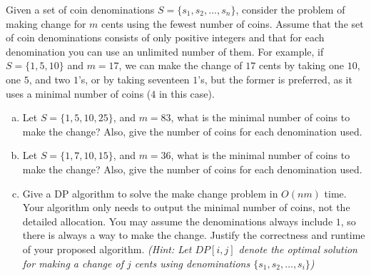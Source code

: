 \documentclass[11pt]{article}
\begin{document}
    \begin{tcolorbox}[title={Problem 2 (Make Change, 50 points)}] \setlength\parindent{1em}
        
     Given a set of coin denominations $S=\{s_1, s_2,\dots, s_n\}$, consider the problem of making change for $m$ cents using the fewest
        number of coins. Assume that the set of coin denominations consists of only positive integers and that for each denomination you can use an unlimited number of them. For example, if $S=\{1, 5, 10\}$ and $m=17$, we can make the change of $17$ cents by taking one $10$, one $5$, and two $1$'s, or by taking seventeen $1$'s, but the former is preferred, as it uses a minimal number of coins ($4$ in this case).

    \begin{enumerate}[(a)]
    \item Let $S=\{1, 5, 10, 25\}$, and $m=83$, what is the minimal number of coins to make the change? Also, give the number of coins for each denomination used.
    \item Let $S=\{1, 7, 10, 15\}$, and $m=36$, what is the minimal number of coins to make the change? Also, give the number of coins for each denomination used.
    \item Give a DP algorithm to solve the make change problem in $O(nm)$ time. Your algorithm only needs to output the minimal number of coins, not the detailed allocation. You may assume the denominations always include $1$, so there is always a way to make the change. Justify the correctness and runtime of your proposed algorithm. \textit{(Hint: Let $DP[i,j]$ denote the optimal solution for making a change of $j$ cents using denominations $\{s_1, s_2, \dots, s_i\}$)}
    \end{enumerate}
    \end{tcolorbox}
    
    
    \newpage

    
    
\end{document}
